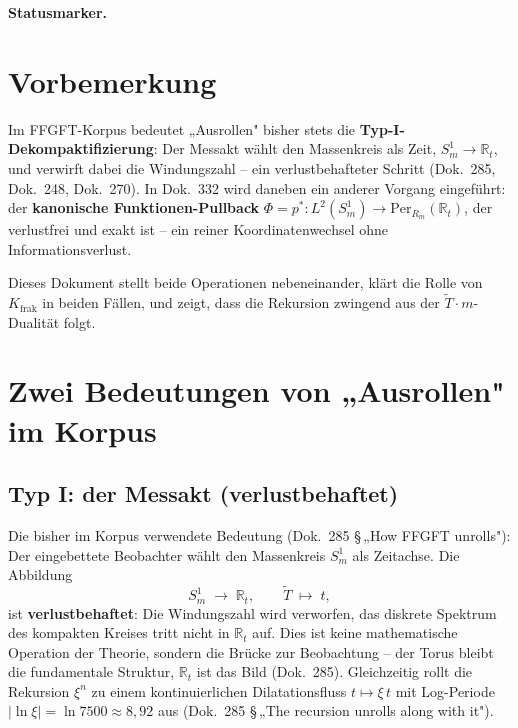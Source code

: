 
\medskip\noindent\textbf{Statusmarker.}


\section*{Vorbemerkung}

Im FFGFT-Korpus bedeutet „Ausrollen" bisher stets die
\textbf{Typ-I-Dekompaktifizierung}: Der Messakt wählt den Massenkreis
als Zeit, $S^1_m\to\mathbb{R}_t$, und verwirft dabei die Windungszahl
-- ein verlustbehafteter Schritt (Dok.~285, Dok.~248, Dok.~270).
In Dok.~332 wird daneben ein anderer Vorgang eingeführt: der
\textbf{kanonische Funktionen-Pullback}
$\Phi=p^*:L^2(S^1_m)\to\mathrm{Per}_{R_m}(\mathbb{R}_t)$, der
verlustfrei und exakt ist -- ein reiner Koordinatenwechsel ohne
Informationsverlust.

Dieses Dokument stellt beide Operationen nebeneinander, klärt die Rolle
von $K_{\text{frak}}$ in beiden Fällen, und zeigt, dass die Rekursion
zwingend aus der $\tilde{T}\cdot m$-Dualität folgt.

\section{Zwei Bedeutungen von „Ausrollen" im Korpus}

\subsection{Typ I: der Messakt (verlustbehaftet)}

Die bisher im Korpus verwendete Bedeutung (Dok.~285 §\,„How FFGFT
unrolls"): Der eingebettete Beobachter wählt den Massenkreis $S^1_m$
als Zeitachse. Die Abbildung
\[
  S^1_m \;\longrightarrow\; \mathbb{R}_t, \qquad
  \tilde T \;\mapsto\; t,
\]
ist \textbf{verlustbehaftet}: Die Windungszahl wird verworfen, das
diskrete Spektrum des kompakten Kreises tritt nicht in $\mathbb{R}_t$
auf. Dies ist keine mathematische Operation der Theorie, sondern die
Brücke zur Beobachtung -- der Torus bleibt die fundamentale Struktur,
$\mathbb{R}_t$ ist das Bild (Dok.~285). Gleichzeitig rollt die
Rekursion $\xi^n$ zu einem kontinuierlichen Dilatationsfluss
$t\mapsto\xi\,t$ mit Log-Periode $|\ln\xi|=\ln 7500\approx 8{,}92$
aus (Dok.~285 §\,„The recursion unrolls along with it").

